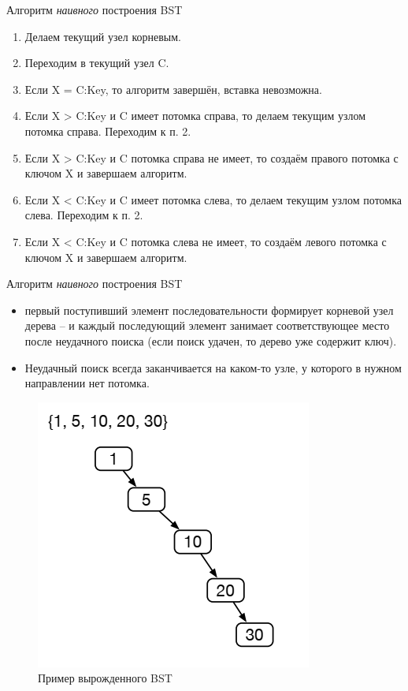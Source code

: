 \documentclass{beamer}
\begin{document}
\begin{frame}{Алгоритм \textit{наивного} построения BST}
	\begin{enumerate}
		\item Делаем текущий узел корневым.
		\item Переходим в текущий узел C.
		\item Если X = C:Key, то алгоритм завершён, вставка невозможна.
		\item Если X > C:Key и C имеет потомка справа, то делаем текущим узлом потомка справа. Переходим к п. 2.
		\item Если X > C:Key и C потомка справа не имеет, то создаём правого потомка с ключом X и завершаем алгоритм.
		\item Если X < C:Key и C имеет потомка слева, то делаем текущим узлом потомка слева. Переходим к п. 2.
		\item Если X < C:Key и C потомка слева не имеет, то создаём левого потомка с ключом X и завершаем алгоритм.
	\end{enumerate}	
\end{frame}	

\begin{frame}{Алгоритм \textit{наивного} построения BST}
	\begin{itemize}
		\item первый поступивший элемент последовательности формирует корневой узел дерева -- и каждый последующий элемент занимает соответствующее место после неудачного поиска (если поиск удачен, то дерево уже содержит ключ). 
		\item Неудачный поиск всегда заканчивается на каком-то узле, у которого в нужном направлении нет потомка.
	\end{itemize}
	\begin{figure}[h]
		\centering
		\includegraphics[scale=0.4]{images/lec07-pic04.png}
		\caption{Пример вырожденного BST}
	\end{figure}
\end{frame}	
\end{document}

